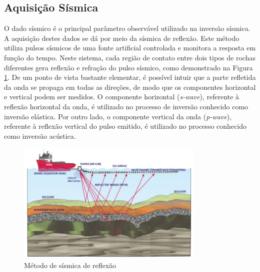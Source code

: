 \subsection{Aquisição Sísmica}
O dado sísmico é o principal parâmetro observável utilizado na inversão sísmica.
A aquisição destes dados se dá por meio da sísmica de reflexão. Este
método utiliza pulsos sísmicos de uma fonte artificial controlada e monitora a resposta em
função do tempo. Neste sistema, cada região de contato entre dois tipos de rochas
diferentes gera reflexão e refração do pulso sísmico, como demonstrado na Figura
\ref{fig:1sismica}.
De um ponto de vista bastante elementar, é possível intuir que a parte refletida da onda se
propaga em todas as direções, de modo que os componentes horizontal e vertical podem ser medidos.
O componente horizontal (\textit{s-wave}), referente à reflexão horizontal
da onda, é utilizado no processo de inversão conhecido como inversão elástica. Por outro lado, o componente
vertical da onda (\textit{p-wave}), referente à reflexão vertical do pulso emitido, é utilizado no processo
conhecido como inversão acústica.
\begin{figure}[ht!]
\begin{center}
  \includegraphics[width=0.8\textwidth]{fig/seismic_survey_2}
  \caption{Método de sísmica de reflexão \citep{figsismica}}
  \label{fig:1sismica}
\end{center}
\end{figure}

